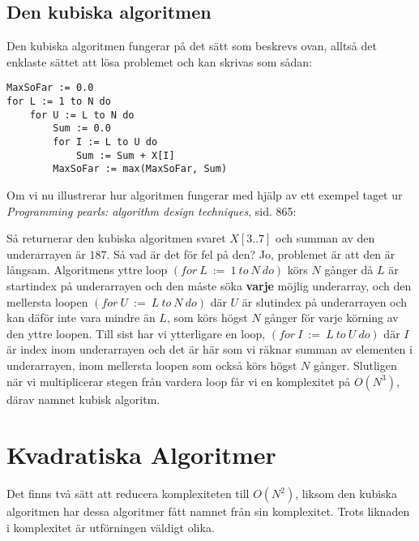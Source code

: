 \documentclass[a4paper,12pt]{article}
\begin{document}
\subsection*{Den kubiska algoritmen}
\label{sec:kubisk}
Den kubiska algoritmen fungerar på det sätt som beskrevs ovan, alltså det
enklaste sättet att lösa problemet och kan skrivas som sådan:
\begin{verbatim}
MaxSoFar := 0.0
for L := 1 to N do
    for U := L to N do
        Sum := 0.0
        for I := L to U do
            Sum := Sum + X[I]
        MaxSoFar := max(MaxSoFar, Sum)
\end{verbatim}
%
\pagebreak
Om vi nu illustrerar hur algoritmen fungerar med hjälp av ett exempel taget ur
\textit{Programming pearls: algorithm design techniques}, sid. 865:
\begin{center}
\end{center}
Så returnerar den kubiska algoritmen svaret $X[3..7]$ och summan av den
underarrayen är $187$. Så vad är det för fel på den? Jo, problemet är att den
är långsam. Algoritmens yttre loop $(for~L~:=~1~to~N~do)$ körs $N$ gånger då
$L$ är startindex på underarrayen och den måste söka \textbf{varje} möjlig
underarray, och den mellersta loopen $(for~U~:=~L~to~N~do)$ där $U$ är
slutindex på underarrayen och kan däför inte vara mindre än $L$, som
körs högst $N$ gånger för varje körning av den yttre loopen. Till sist har vi
ytterligare en loop, $(for~I~:=~L~to~U~do)$ där $I$ är index inom underarrayen
och det är här som vi räknar summan av elementen i underarrayen, inom mellersta loopen som också körs högst $N$ gånger.
Slutligen när vi multiplicerar stegen från vardera loop får vi en komplexitet
på $O\left(N^3\right)$, därav namnet kubisk algoritm.
%
\section{Kvadratiska Algoritmer}
Det finns två sätt att reducera komplexiteten till $O\left(N^2\right)$, liksom
den kubiska algoritmen har dessa algoritmer fått namnet från sin komplexitet.
Trots liknaden i komplexitet är utförningen väldigt olika.
\label{kvadratisk}
\end{document}
